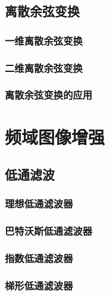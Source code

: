 \documentclass[cn, blue, normal, 12pt]{elegantnote}
\begin{document}
{\subsection{离散余弦变换}

\subsubsection{一维离散余弦变换}



\subsubsection{二维离散余弦变换}



\subsubsection{离散余弦变换的应用}



\section{频域图像增强}

\subsection{低通滤波}



\subsubsection{理想低通滤波器}



\subsubsection{巴特沃斯低通滤波器}



\subsubsection{指数低通滤波器}



\subsubsection{梯形低通滤波器}



}
\end{document}
